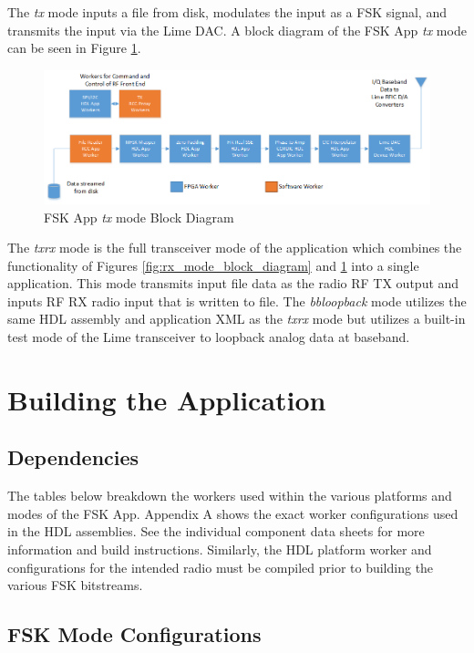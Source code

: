 \noindent The \textit{tx} mode inputs a file from disk, modulates the input as a FSK signal, and transmits the input via the Lime DAC. A block diagram of the FSK App \textit{tx} mode can be seen in Figure \ref{fig:tx_mode_block_diagram}.\par\medskip
	\begin{figure}[ht]
	 	\centering
		\includegraphics[scale=.65]{tx_mode_block_diagram}
		\caption{FSK App \textit{tx} mode Block Diagram}
		\label{fig:tx_mode_block_diagram}
	\end{figure}

\noindent The \textit{txrx} mode is the full transceiver mode of the application which combines the functionality of Figures \ref{fig:rx_mode_block_diagram} and \ref{fig:tx_mode_block_diagram} into a single application. This mode transmits input file data as the radio RF TX output and inputs RF RX radio input that is written to file. The \textit{bbloopback} mode utilizes the same HDL assembly and application XML as the \textit{txrx} mode but utilizes a built-in test mode of the Lime transceiver to loopback analog data at baseband.\par\medskip

\section{Building the Application}
\subsection{Dependencies}
\noindent The tables below breakdown the workers used within the various platforms and modes of the FSK App. Appendix A shows the exact worker configurations used in the HDL assemblies. See the individual component data sheets for more information and build instructions. Similarly, the HDL platform worker and configurations for the intended radio must be compiled prior to building the various FSK bitstreams.
\subsection{FSK Mode Configurations}
